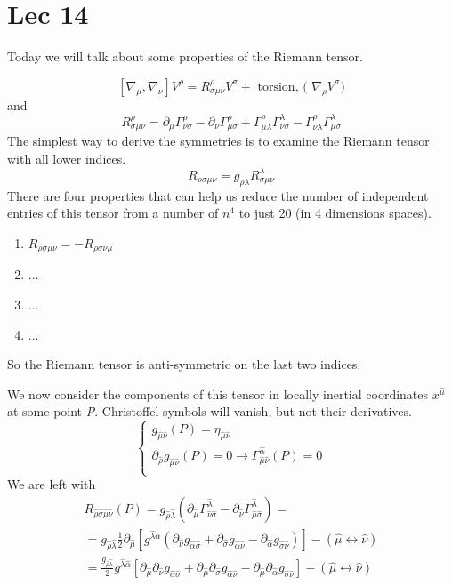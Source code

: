 \section{Lec 14}
Today we will talk about some properties of the Riemann tensor.\par
\[
	[\nabla _{\mu }, \nabla _{\nu }] V^{\rho } = R^{\rho }_{\sigma \mu \nu } V^{\sigma } + \text{ torsion, ( } \nabla _{\rho }V^{\sigma }\text{)}
\]
and 
\[
	R^{\rho }_{\sigma \mu \nu } = \partial_{\mu }\Gamma^{\rho }_{\nu \sigma } - \partial_{\nu }\Gamma ^{\rho }_{\mu \sigma } + \Gamma  ^{\rho }_{\mu \lambda } \Gamma ^{\lambda }_{\nu \sigma } -\Gamma ^{\rho }_{\nu \lambda }\Gamma ^{\lambda }_{\mu \sigma }
\]
The simplest way to derive the symmetries is to examine the Riemann tensor with all lower indices.
\[
R_{\rho \sigma \mu \nu } = g_{\rho \lambda } R^{\lambda }_{\sigma \mu \nu }
\]
There are four properties that can help us reduce the number of independent entries of this tensor from a number of $n^{4}$ to just 20 (in 4 dimensions spaces).
\begin{enumerate}
\item $R_{\rho \sigma \mu \nu } = - R_{\rho \sigma \nu \mu } $ 
\item ... 
	\item ...
	\item ...
\end{enumerate}
So the Riemann tensor is anti-symmetric on the last two indices.\par
We now consider the components of this tensor in locally inertial coordinates $x^{\hat{\mu }}$ at some point \emph{P}. Christoffel symbols will vanish, but not their derivatives.
\begin{equation}
\begin{cases}
g_{\hat{\mu }\hat{\nu }} \left( P \right) = \eta _{\hat{\mu }\hat{\nu }} \\
\partial_{\hat{\rho }} g_{\hat{\mu }\hat{\nu }}\left( P \right) = 0 \to \Gamma ^{\hat{\alpha }}_{\hat{\mu }\hat{\nu }} \left( P \right) = 0 \\
\end{cases}
\end{equation}
We are left with
\begin{gather*}
R_{\hat{\rho }\hat{\sigma }\hat{\mu }\hat{\nu }} \left( P \right) = g_{\hat{\rho }\hat{\lambda }} \left( \partial_{\hat{\mu }} \Gamma ^{\hat{\lambda }}_{\hat{\nu }\hat{\sigma }} - \partial_{\hat{\nu }} \Gamma ^{\hat{\lambda }}_{\hat{\mu }\hat{\sigma }} \right)  = \\
= g_{\hat{\rho }\hat{\lambda }} \frac{1}{2} \partial_{\hat{\mu } } [ g^{\hat{\lambda }\hat{\alpha }} \left( \partial_{\hat{\nu }} g_{\hat{\alpha  }\hat{\sigma }} + \partial_{\hat{\sigma }} g_{\hat{\alpha }\hat{\nu }} - \partial_{\hat{\alpha }} g_{\hat{\sigma }\hat{\nu }} \right) ] - \left( \hat{\mu } \leftrightarrow \hat{\nu } \right) \\
= \frac{g_{\hat{\rho }\hat{\lambda }}}{2} g^{\hat{\lambda }\hat{\alpha }} [ \partial_{\hat{\mu }} \partial_{\hat{\nu }} g_{\hat{\alpha }\hat{\sigma }} + \partial_{\hat{\mu }}\partial_{\hat{\sigma }} g_{\hat{\alpha }\hat{\nu }} - \partial_{\hat{\mu }}\partial_{\hat{\alpha }} g_{\hat{\sigma }\hat{\nu }}] - \left( \hat{\mu } \leftrightarrow \hat{\nu } \right)
\end{gather*} 
